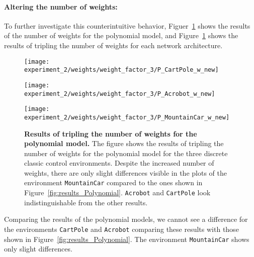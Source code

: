 \paragraph*{Altering the number of weights:} To further investigate this counterintuitive behavior, Figuer~\ref{fig:results_NN_weights} shows the results of the number of weights for the polynomial model, and Figure~\ref{fig:results_NN_weights} shows the results of tripling the number of weights for each network architecture.
\begin{figure}[!ht]
  \centering
  \texttt{[image: experiment\_2/weights/weight\_factor\_3/P\_CartPole\_w\_new]}

  \vspace{0.2cm}

  \texttt{[image: experiment\_2/weights/weight\_factor\_3/P\_Acrobot\_w\_new]}

  \vspace{0.2cm}

  \texttt{[image: experiment\_2/weights/weight\_factor\_3/P\_MountainCar\_w\_new]}
\caption[Results of tripling the number of weights for the poylnomial model]{
  \textbf{Results of tripling the number of weights for the polynomial model.}
   The figure shows the results of tripling the number of weights for the polynomial model for the three discrete classic control environments. Despite the increased number of weights, there are only slight differences visible in the plots of the environment \texttt{MountainCar} compared to the ones shown in Figure~\ref{fig:results_Polynomial}. \texttt{Acrobot} and \texttt{CartPole} look indistinguishable from the other results.
}
\label{fig:results_NN_weights}
\end{figure}
Comparing the results of the polynomial models, we cannot see a difference for the environments \verb|CartPole| and \verb|Acrobot| comparing these results with those shown in Figure~\ref{fig:results_Polynomial}. The environment \verb|MountainCar| shows only slight differences.

